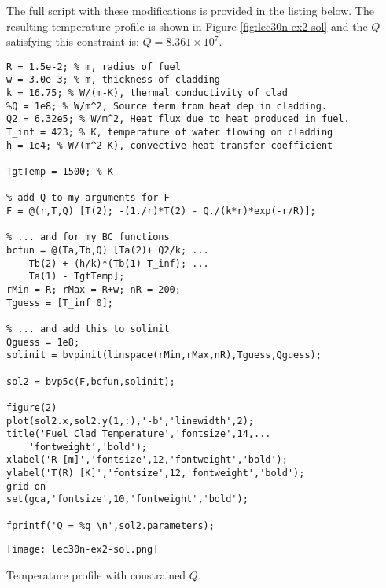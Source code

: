 The full script with these modifications is provided in the listing below. The resulting temperature profile is shown in Figure \ref{fig:lec30n-ex2-sol} and the $Q$ satisfying this constraint is: $Q = 8.361\times 10^{7}$. 

\begin{lstlisting}[style=myMatlab,name=lec30n-ex2]
R = 1.5e-2; % m, radius of fuel
w = 3.0e-3; % m, thickness of cladding
k = 16.75; % W/(m-K), thermal conductivity of clad
%Q = 1e8; % W/m^2, Source term from heat dep in cladding. 
Q2 = 6.32e5; % W/m^2, Heat flux due to heat produced in fuel.
T_inf = 423; % K, temperature of water flowing on cladding
h = 1e4; % W/(m^2-K), convective heat transfer coefficient

TgtTemp = 1500; % K

% add Q to my arguments for F
F = @(r,T,Q) [T(2); -(1./r)*T(2) - Q./(k*r)*exp(-r/R)];

% ... and for my BC functions
bcfun = @(Ta,Tb,Q) [Ta(2)+ Q2/k; ...
    Tb(2) + (h/k)*(Tb(1)-T_inf); ...
    Ta(1) - TgtTemp];
rMin = R; rMax = R+w; nR = 200;
Tguess = [T_inf 0];

% ... and add this to solinit
Qguess = 1e8;
solinit = bvpinit(linspace(rMin,rMax,nR),Tguess,Qguess);

sol2 = bvp5c(F,bcfun,solinit);

figure(2)
plot(sol2.x,sol2.y(1,:),'-b','linewidth',2);
title('Fuel Clad Temperature','fontsize',14,...
    'fontweight','bold');
xlabel('R [m]','fontsize',12,'fontweight','bold');
ylabel('T(R) [K]','fontsize',12,'fontweight','bold');
grid on
set(gca,'fontsize',10,'fontweight','bold');

fprintf('Q = %g \n',sol2.parameters);
\end{lstlisting}
\begin{marginfigure}
\texttt{[image: lec30n-ex2-sol.png]}
\caption{Temperature profile with constrained $Q$.}
\label{fig:lec30n-ex2-sol}
\end{marginfigure}
